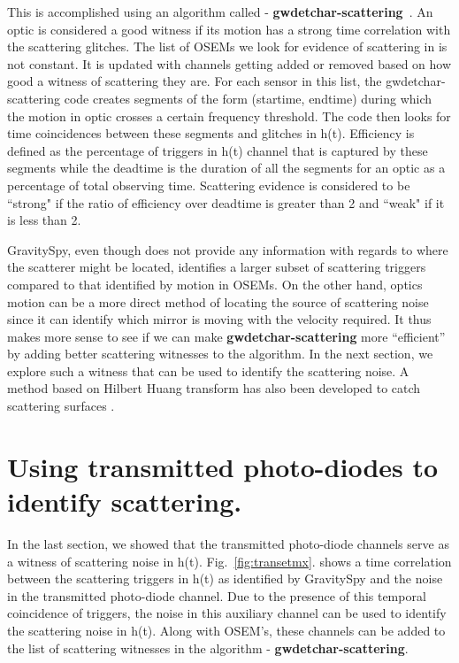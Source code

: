 \documentclass[12pt]{iopart}
\begin{document}
This is accomplished using an algorithm called - \textbf{gwdetchar-scattering}~\cite{alex_l_urban_2019_3526829}. An optic is considered a good witness if its motion has a strong time correlation with the scattering glitches. The list of OSEMs we look for evidence of scattering in is not constant. It is updated with channels getting added or removed based on how good a witness of scattering they are. For each sensor in this list, the gwdetchar-scattering code creates segments of the form (startime, endtime) during which the motion in optic crosses a certain frequency threshold.  The code then looks for time coincidences between these segments and glitches in h(t). Efficiency is defined as the percentage of triggers in h(t) channel that is captured by these segments while the deadtime is the duration of all the segments for an optic as a percentage of total observing time. Scattering evidence is considered to be ``strong" if the ratio of efficiency over deadtime is greater than 2 and ``weak" if it is less than 2. 


GravitySpy, even though does not provide any information with regards to where the scatterer might be located, identifies a larger subset of scattering triggers compared to that identified by motion in OSEMs. On the other hand, optics motion can be a more direct method of locating the source of scattering noise since it can identify which mirror is moving with the velocity required. It thus makes more sense to see if we can make \textbf{gwdetchar-scattering} more ``efficient'' by adding better scattering witnesses to the algorithm. In the next section, we explore such a witness that can be used to identify the scattering noise. A method based on Hilbert Huang transform has also been developed to catch scattering surfaces \cite{hhtransform}. 

\section{Using transmitted photo-diodes to identify scattering.}\label{transmonwitness}
In the last section, we showed that the transmitted photo-diode channels serve as a witness of scattering noise in h(t). Fig.~\ref{fig:transetmx}. shows a time correlation between the scattering triggers in h(t) as identified by GravitySpy and the noise in the transmitted photo-diode channel. Due to the presence of this temporal coincidence of triggers, the noise in this auxiliary channel can be used to identify the scattering noise in h(t). Along with OSEM’s, these channels can be added to the list of scattering witnesses in the algorithm - \textbf{gwdetchar-scattering}.
\end{document}
